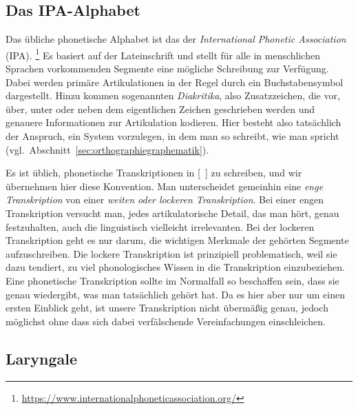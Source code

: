 
\subsection{Das IPA-Alphabet}

\label{sec:ipaalphabet}

Das übliche phonetische Alphabet ist das der \textit{International Phonetic Association} (IPA).%
\footnote{\url{https://www.internationalphoneticassociation.org/}}	
Es basiert auf der Lateinschrift und stellt für alle in menschlichen Sprachen vorkommenden Segmente eine mögliche Schreibung zur Verfügung.
Dabei werden primäre Artikulationen in der Regel durch ein Buchstabensymbol dargestellt.
Hinzu kommen sogenannten \textit{Diakritika}, also Zusatzzeichen, die vor, über, unter oder neben dem eigentlichen Zeichen geschrieben werden und genauere Informationen zur Artikulation kodieren.
Hier besteht also tatsächlich der Anspruch, ein System vorzulegen, in dem man so schreibt, wie man spricht (vgl.\ Abschnitt~\ref{sec:orthographiegraphematik}).

Es ist üblich, phonetische Transkriptionen in [~] zu schreiben, und wir übernehmen hier diese Konvention.
Man unterscheidet gemeinhin eine \textit{enge Transkription} von einer \textit{weiten oder lockeren Transkription}.
Bei einer engen Transkription versucht man, jedes artikulatorische Detail, das man hört, genau festzuhalten, auch die linguistisch vielleicht irrelevanten.
Bei der lockeren Transkription geht es nur darum, die wichtigen Merkmale der gehörten Segmente aufzuschreiben.
Die lockere Transkription ist prinzipiell problematisch, weil sie dazu tendiert, zu viel phonologisches Wissen in die Transkription einzubeziehen.
Eine phonetische Transkription sollte im Normalfall so beschaffen sein, dass sie genau wiedergibt, was man tatsächlich gehört hat.
Da es hier aber nur um einen ersten Einblick geht, ist unsere Transkription nicht übermäßig genau, jedoch möglichst ohne dass sich dabei verfälschende Vereinfachungen einschleichen.

\subsection{Laryngale}

\label{sec:laryngale}

